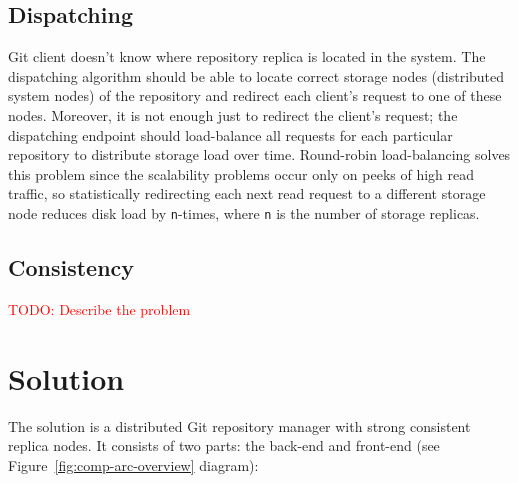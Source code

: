 \documentclass[acmlarge, screen, nonacm, 11pt]{acmart}
\newcommand{\code}[1]{\texttt{#1}}
\newcommand{\todo}[1]{\textcolor{red}{TODO: #1}}
\begin{document}
\subsection{Dispatching}\label{sec:dispatching}

Git client doesn't know where repository replica is located in the system. The dispatching algorithm
should be able to locate correct storage nodes (distributed system nodes) of the repository and redirect
each client's request to one of these nodes. Moreover, it is not enough just to redirect the client's request;
the dispatching endpoint should load-balance all requests for each particular repository to distribute
storage load over time. Round-robin load-balancing solves this problem since the scalability problems
occur only on peeks of high read traffic, so statistically redirecting each next read request to
a different storage node reduces disk load by \code{n}-times, where \code{n} is the number of storage replicas.

\subsection{Consistency}

\todo{Describe the problem}


\section{Solution}\label{sec:solution}

The solution is a distributed Git repository manager with strong
consistent replica nodes.
It consists of two parts: the back-end and front-end
(see Figure~\ref{fig:comp-arc-overview} diagram):
\end{document}
